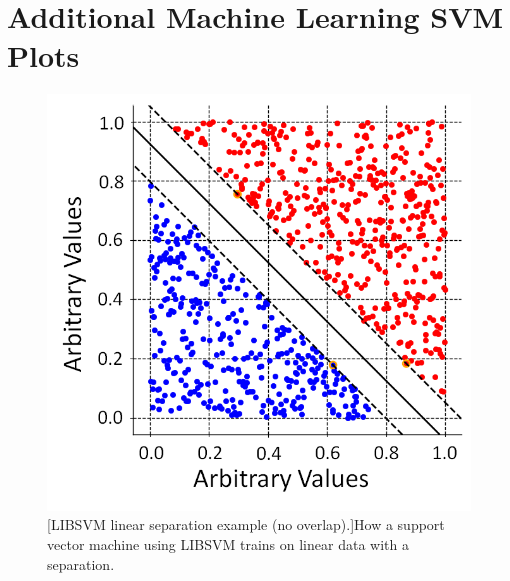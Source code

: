 \chapter{Additional Machine Learning SVM Plots} 

\begin{figure}[!h]
\centering
\begin{minipage}{.45\textwidth}
  \centering
  \includegraphics[width=\linewidth]{Chapter4/Figs/adjustedSvmPlots/adjusted_LinSepExample.png}
  [LIBSVM linear separation example (no overlap).]{How a support vector machine using LIBSVM trains on linear data with a separation.} 
  \label{fig:LinSepExample}
  \vspace{0.478cm}
\end{minipage}%
\qquad
\begin{minipage}{.45\textwidth}
  \centering

\end{minipage}
\end{figure}
